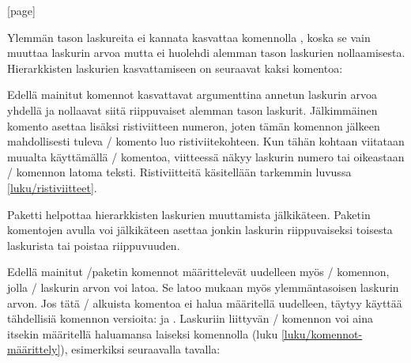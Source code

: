 \begin{koodilohkosis}
[page]
\end{koodilohkosis}

\noindent
Ylemmän tason laskureita ei kannata kasvattaa komennolla
, koska se vain muuttaa laskurin arvoa mutta ei
huolehdi alemman tason laskurien nollaamisesta. Hierarkkisten laskurien
kasvattamiseen on seuraavat kaksi komentoa:

\begin{koodilohkosis}
\end{koodilohkosis}

\noindent
Edellä mainitut komennot kasvattavat argumenttina annetun laskurin arvoa
yhdellä ja nollaavat siitä riippuvaiset alemman tason laskurit.
Jälkimmäinen komento  asettaa lisäksi
ristiviitteen numeron, joten tämän komennon jälkeen mahdollisesti tuleva
\-/ komento luo ristiviitekohteen. Kun tähän kohtaan
viitataan muualta käyttämällä \-/ komentoa, viitteessä
näkyy laskurin numero tai oikeastaan \-/ komennon
latoma teksti. Ristiviitteitä käsitellään tarkemmin luvussa
\ref{luku/ristiviitteet}.

Paketti  helpottaa hierarkkisten laskurien
muuttamista jälkikäteen. Paketin komentojen avulla voi jälkikäteen
asettaa jonkin laskurin riippuvaiseksi toisesta laskurista tai poistaa
riippuvuuden.

\begin{koodilohkosis}
\end{koodilohkosis}

\noindent
Edellä mainitut \-/paketin komennot määrittelevät
uudelleen myös \-/ komennon, jolla \-/
laskurin arvon voi latoa. Se latoo mukaan myös ylemmäntasoisen laskurin
arvon. Jos tätä \-/ alkuista komentoa ei halua määritellä
uudelleen, täytyy käyttää tähdellisiä komennon versioita:
 ja . Laskuriin
liittyvän \-/ komennon voi aina itsekin määritellä
haluamansa laiseksi komennolla  (luku
\ref{luku/komennot-määrittely}), esimerkiksi seuraavalla tavalla:

